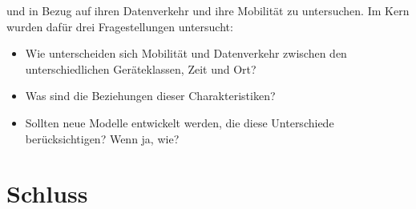 \documentclass[12pt, a4paper]{article}
\begin{document}
und in Bezug auf ihren Datenverkehr und ihre Mobilität zu untersuchen.
\newline\newline
Im Kern wurden dafür drei Fragestellungen untersucht:\newline
\begin{itemize}
    \item Wie unterscheiden sich Mobilität und Datenverkehr zwischen den unterschiedlichen Geräteklassen, Zeit und Ort?
    \item Was sind die Beziehungen dieser Charakteristiken?
    \item Sollten neue Modelle entwickelt werden, die diese Unterschiede berücksichtigen? Wenn ja, wie?
\end{itemize}

\pagebreak

\section{Schluss}


%

\end{document}
